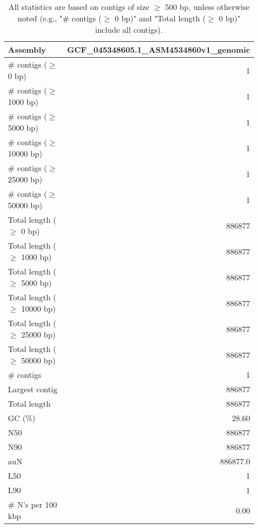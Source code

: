 \documentclass[12pt,a4paper]{article}
\begin{document}
\begin{table}[ht]
\begin{center}
\caption{All statistics are based on contigs of size $\geq$ 500 bp, unless otherwise noted (e.g., "\# contigs ($\geq$ 0 bp)" and "Total length ($\geq$ 0 bp)" include all contigs).}
\begin{tabular}{|l*{1}{|r}|}
\hline
Assembly & GCF\_045348605.1\_ASM4534860v1\_genomic \\ \hline
\# contigs ($\geq$ 0 bp) & 1 \\ \hline
\# contigs ($\geq$ 1000 bp) & 1 \\ \hline
\# contigs ($\geq$ 5000 bp) & 1 \\ \hline
\# contigs ($\geq$ 10000 bp) & 1 \\ \hline
\# contigs ($\geq$ 25000 bp) & 1 \\ \hline
\# contigs ($\geq$ 50000 bp) & 1 \\ \hline
Total length ($\geq$ 0 bp) & 886877 \\ \hline
Total length ($\geq$ 1000 bp) & 886877 \\ \hline
Total length ($\geq$ 5000 bp) & 886877 \\ \hline
Total length ($\geq$ 10000 bp) & 886877 \\ \hline
Total length ($\geq$ 25000 bp) & 886877 \\ \hline
Total length ($\geq$ 50000 bp) & 886877 \\ \hline
\# contigs & 1 \\ \hline
Largest contig & 886877 \\ \hline
Total length & 886877 \\ \hline
GC (\%) & 28.60 \\ \hline
N50 & 886877 \\ \hline
N90 & 886877 \\ \hline
auN & 886877.0 \\ \hline
L50 & 1 \\ \hline
L90 & 1 \\ \hline
\# N's per 100 kbp & 0.00 \\ \hline
\end{tabular}
\end{center}
\end{table}
\end{document}
